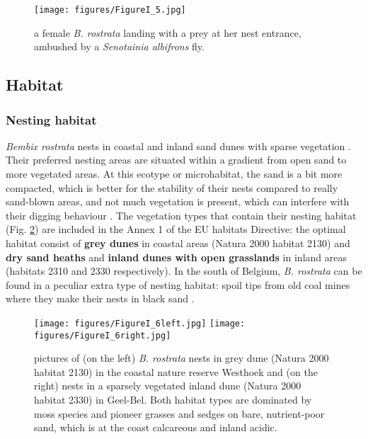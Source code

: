 \documentclass[10pt, twoside]{book} %
\begin{document}
	\begin{figure}[h!]
		\begin{center}
			\texttt{[image: figures/FigureI\_5.jpg]}
		\end{center}
		\begin{footnotesize}
			\caption{a female \textit{B. rostrata} landing with a prey at her nest entrance, ambushed by a \textit{Senotainia albifrons} fly. \label{figI.5}}
		\end{footnotesize}
	\end{figure}
	
	
	\subsection{Habitat}
	\subsubsection{Nesting habitat}
	\textit{Bembix rostrata} nests in coastal and inland sand dunes with sparse vegetation \citep[Fig. \ref{figI.6};][]{nielsen1945, larsson1986}. Their preferred nesting areas are situated within a gradient from open sand to more vegetated areas. At this ecotype or microhabitat, the sand is a bit more compacted, which is better for the stability of their nests compared to really sand-blown areas, and not much vegetation is present, which can interfere with their digging behaviour \citep{nielsen1945}. The vegetation types that contain their nesting habitat (Fig. \ref{figI.6}) are included in the Annex 1 of the EU habitats Directive: the optimal habitat consist of \textbf{grey dunes} in coastal areas (Natura 2000 habitat 2130) and \textbf{dry sand heaths} and \textbf{inland dunes with open grasslands} in inland areas (habitats 2310 and 2330 respectively). In the south of Belgium, \textit{B. rostrata} can be found in a peculiar extra type of nesting habitat: spoil tips from old coal mines where they make their nests in black sand \citep{barbier2007}.
	
	\begin{figure}[ht!]
		\begin{center}%
			\texttt{[image: figures/FigureI\_6left.jpg]}%
			\texttt{[image: figures/FigureI\_6right.jpg]}%
		\end{center}
		\begin{footnotesize}
			\caption{pictures of (on the left) \textit{B. rostrata} nests in grey dune (Natura 2000 habitat 2130) in the coastal nature reserve Westhoek and (on the right) nests in a sparsely vegetated inland dune (Natura 2000 habitat 2330) in Geel-Bel. Both habitat types are dominated by moss species and pioneer grasses and sedges on bare, nutrient-poor sand, which is at the coast calcareous and inland acidic. \label{figI.6}}
		\end{footnotesize}
	\end{figure}
	
\end{document}
